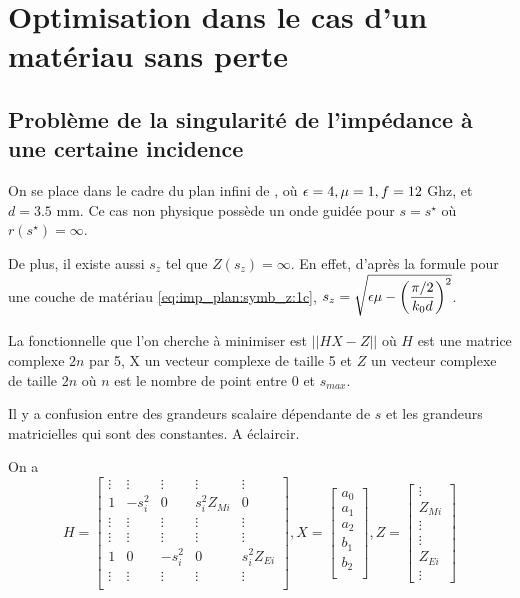 \section{Optimisation dans le cas d'un matériau sans perte}

\subsection{Problème de la singularité de l'impédance à une certaine incidence}
On se place dans le cadre du plan infini de \cite{soudais_3d_2017}, où \(\epsilon=4,\mu=1,f=12\) Ghz, et \(d=3.5\) mm. Ce cas non physique possède un onde guidée pour \(s=s^\star\) où \(r(s^\star) = \infty\).

De plus, il existe aussi \(s_z\) tel que \(Z(s_z) = \infty\). En effet, d'après la formule pour une couche de matériau \eqref{eq:imp_plan:symb_z:1c}, \(s_z = \sqrt{\epsilon \mu - \left(\dfrac{\pi/2}{k_0 d}\right)^2}\).

La fonctionnelle que l'on cherche à minimiser est \(||H X - Z||\) où \(H\) est une matrice complexe \(2n\) par 5, X un vecteur complexe de taille 5 et \(Z\) un vecteur complexe de taille \(2n\) où \(n\) est le nombre de point entre 0 et \(s_{max}\).

\begin{TODO}
  Il y a confusion entre des grandeurs scalaire dépendante de \(s\) et les grandeurs matricielles qui sont des constantes. A éclaircir.
\end{TODO}

On a
\[
  H = \begin{bmatrix}
  \vdots & \vdots & \vdots & \vdots &\vdots \\
  1 & -s_i^2 & 0 & s_i^2 Z_{Mi} & 0 \\
  \vdots & \vdots & \vdots & \vdots &\vdots \\
  \vdots & \vdots & \vdots & \vdots &\vdots \\
  1 & 0 &-s_i^2 & 0 & s_i^2 Z_{Ei} \\
  \vdots & \vdots & \vdots & \vdots &\vdots \\
  \end{bmatrix},
  X = \begin{bmatrix}
  a_0\\
  a_1\\
  a_2\\
  b_1\\
  b_2\\
  \end{bmatrix},
  Z=\begin{bmatrix}
  \vdots\\
  Z_{Mi}\\
  \vdots\\
  \vdots\\
  Z_{Ei}\\
  \vdots
  \end{bmatrix}
\]

